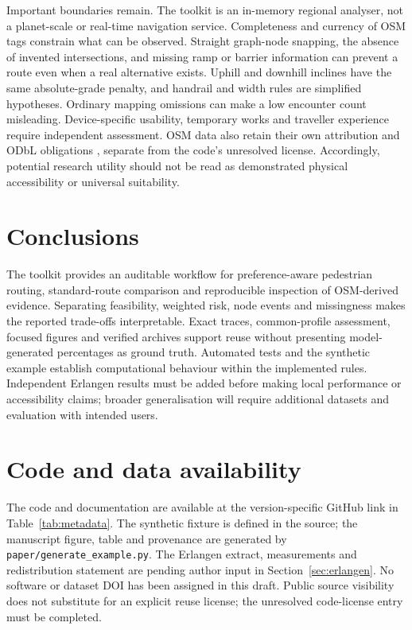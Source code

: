 \documentclass[preprint,12pt,a4paper]{elsarticle}
\begin{document}
Important boundaries remain. The toolkit is an in-memory regional analyser,
not a planet-scale or real-time navigation service. Completeness and currency
of OSM tags constrain what can be observed. Straight graph-node snapping,
the absence of invented intersections, and missing ramp or barrier information
can prevent a route even when a real alternative exists. Uphill and downhill
inclines have the same absolute-grade penalty, and handrail and width rules
are simplified hypotheses. Ordinary mapping omissions can make a low
encounter count misleading. Device-specific usability, temporary works and
traveller experience require independent assessment. OSM data also retain
their own attribution and ODbL obligations \cite{osmlicense}, separate from
the code's unresolved license. Accordingly, potential research utility should
not be read as demonstrated physical accessibility or universal suitability.

\section{Conclusions}
\label{sec:conclusions}
The toolkit provides an auditable workflow for preference-aware pedestrian
routing, standard-route comparison and reproducible inspection of OSM-derived
evidence. Separating feasibility, weighted risk, node events and missingness
makes the reported trade-offs interpretable. Exact traces, common-profile
assessment, focused figures and verified archives support reuse without
presenting model-generated percentages as ground truth. Automated tests and
the synthetic example establish computational behaviour within the implemented
rules. Independent Erlangen results must be added before making local
performance or accessibility claims; broader generalisation will require
additional datasets and evaluation with intended users.

\section*{Code and data availability}
The code and documentation are available at the version-specific GitHub link
in Table~\ref{tab:metadata}. The synthetic fixture is defined in the source;
the manuscript figure, table and provenance are generated by
\texttt{paper/generate\_example.py}. The Erlangen extract, measurements and
redistribution statement are pending author input in
Section~\ref{sec:erlangen}. No software or dataset DOI has been assigned in
this draft. Public source visibility does not substitute for an explicit
reuse license; the unresolved code-license entry must be completed.
\end{document}

